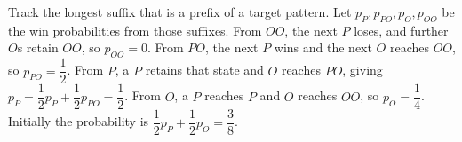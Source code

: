 Track the longest suffix that is a prefix of a target pattern. Let $p_P,p_{PO},p_O,p_{OO}$ be the win probabilities from those suffixes. From $OO$, the next $P$ loses, and further $O$s retain $OO$, so $p_{OO}=0$. From $PO$, the next $P$ wins and the next $O$ reaches $OO$, so $p_{PO}=\dfrac{1}{2}$. From $P$, a $P$ retains that state and $O$ reaches $PO$, giving $p_P=\dfrac{1}{2}p_P+\dfrac{1}{2}p_{PO}=\dfrac{1}{2}$. From $O$, a $P$ reaches $P$ and $O$ reaches $OO$, so $p_O=\dfrac{1}{4}$. Initially the probability is $\dfrac{1}{2}p_P+\dfrac{1}{2}p_O=\boxed{\dfrac{3}{8}}$.
